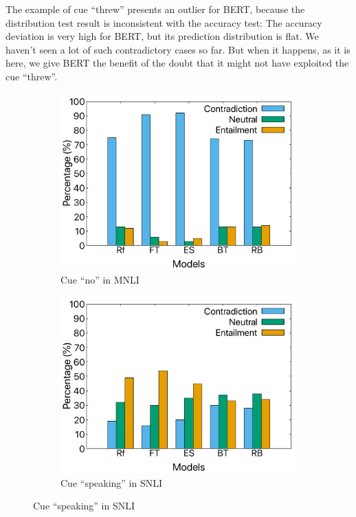 The example of cue ``threw'' presents an outlier for BERT,
because the distribution test result is inconsistent with the accuracy test: 
The accuracy deviation is very high for BERT, but its prediction distribution is
flat. We haven't seen a lot of such contradictory cases so far. 
But when it happens, as it is here, we give BERT the benefit of the doubt 
that it might not have exploited the cue ``threw''. 
\begin{figure}[th]
\centering
\begin{subfigure}[b]{0.49\textwidth}
\centering
\includegraphics[width=\columnwidth]{picture/no-mnli.pdf}
\caption{Cue ``no'' in MNLI}
\label{fig:cue_no}
\end{subfigure}
\hfill
\begin{subfigure}[b]{0.49\textwidth}
\centering
\includegraphics[width=\columnwidth]{picture/speaking-snli.pdf}
\caption{Cue ``speaking'' in SNLI}
\label{fig:cue_speaking}
\end{subfigure}


\end{figure}
